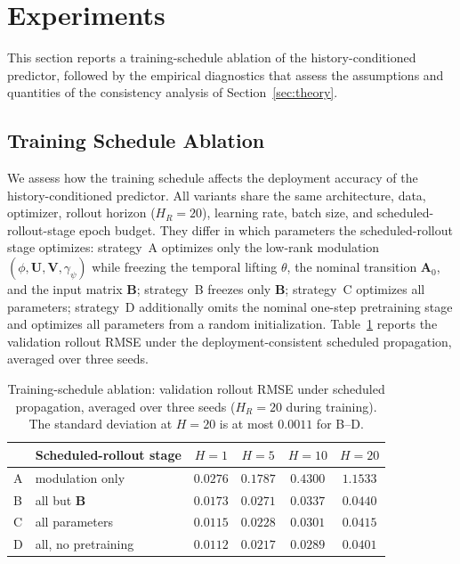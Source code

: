\documentclass[journal]{IEEEtran}
\newcommand{\mA}{\mathbf{A}}
\newcommand{\mB}{\mathbf{B}}
\newcommand{\mU}{\mathbf{U}}
\newcommand{\mV}{\mathbf{V}}
\begin{document}
\section{Experiments}
\label{sec:experiments}

This section reports a training-schedule ablation of the history-conditioned predictor, followed by the empirical diagnostics that assess the assumptions and quantities of the consistency analysis of Section~\ref{sec:theory}.

\subsection{Training Schedule Ablation}
\label{subsec:schedule_ablation}

We assess how the training schedule affects the deployment accuracy of the history-conditioned predictor. All variants share the same architecture, data, optimizer, rollout horizon ($H_R=20$), learning rate, batch size, and scheduled-rollout-stage epoch budget. They differ in which parameters the scheduled-rollout stage optimizes: strategy~A optimizes only the low-rank modulation $(\phi,\mU,\mV,\gamma_\psi)$ while freezing the temporal lifting $\theta$, the nominal transition $\mA_0$, and the input matrix $\mB$; strategy~B freezes only $\mB$; strategy~C optimizes all parameters; strategy~D additionally omits the nominal one-step pretraining stage and optimizes all parameters from a random initialization. Table~\ref{tab:schedule_ablation} reports the validation rollout RMSE under the deployment-consistent scheduled propagation, averaged over three seeds.

\begin{table}[!t]
\centering
\caption{Training-schedule ablation: validation rollout RMSE under scheduled propagation, averaged over three seeds ($H_R=20$ during training). The standard deviation at $H=20$ is at most $0.0011$ for B--D.}
\label{tab:schedule_ablation}
\small
\setlength{\tabcolsep}{4pt}
\begin{tabular}{@{}llcccc@{}}
\toprule
 & Scheduled-rollout stage & $H=1$ & $H=5$ & $H=10$ & $H=20$ \\
\midrule
A & modulation only & $0.0276$ & $0.1787$ & $0.4300$ & $1.1533$ \\
B & all but $\mB$ & $0.0173$ & $0.0271$ & $0.0337$ & $0.0440$ \\
C & all parameters & $0.0115$ & $0.0228$ & $0.0301$ & $0.0415$ \\
D & all, no pretraining & $0.0112$ & $0.0217$ & $0.0289$ & $0.0401$ \\
\bottomrule
\end{tabular}
\end{table}
\end{document}
